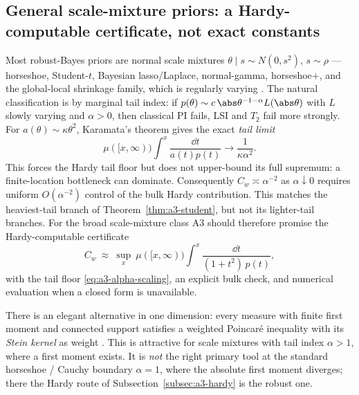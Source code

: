 \documentclass[../../main.tex]{subfiles}
\begin{document}
\subsection{General scale-mixture priors: a Hardy-computable certificate, not exact constants}
\label{subsec:a3-scalemix}

Most robust-Bayes priors are normal scale mixtures $\theta\mid s\sim N(0,s^2)$, $s\sim\rho$ ---
horseshoe, Student-$t$, Bayesian lasso/Laplace, normal-gamma, horseshoe$+$, and the global-local
shrinkage family, which is regularly varying \cite{BhadraDattaPolsonWillard2016}. The natural
classification is by marginal tail index: if $p(\theta)\sim c\,\abs\theta^{-1-\alpha}L(\abs\theta)$
with $L$ slowly varying and $\alpha>0$, then classical PI fails, LSI and $T_2$ fail more strongly.
For $a(\theta)\sim\kappa\theta^2$, Karamata's theorem gives the exact \emph{tail limit}
\begin{equation}\label{eq:a3-alpha-scaling}
  \mu([x,\infty))\int^x\frac{\dd t}{a(t)p(t)}\longrightarrow
  \frac{1}{\kappa\alpha^2}.
\end{equation}
This forces the Hardy tail floor but does not upper-bound its full supremum: a finite-location
bottleneck can dominate. Consequently $C_w\asymp\alpha^{-2}$ as $\alpha\downarrow0$ requires
uniform $O(\alpha^{-2})$ control of the bulk Hardy contribution. This matches the heaviest-tail
branch of Theorem~\ref{thm:a3-student}, but not its lighter-tail branches. For the broad
scale-mixture class A3 should therefore promise the
Hardy-computable certificate
\begin{equation}\label{eq:a3-certificate}
  C_w\ \approx\ \sup_x\ \mu([x,\infty))\int^x\frac{\dd t}{(1+t^2)\,p(t)},
\end{equation}
with the tail floor \eqref{eq:a3-alpha-scaling}, an explicit bulk check, and numerical evaluation
when a closed form is unavailable.

\begin{remark}
\label{rem:a3-stein}
There is an elegant alternative in one dimension: every measure with finite first moment and
connected support satisfies a weighted Poincar\'e inequality with its \emph{Stein kernel} as
weight \cite{Saumard2019SteinKernel}. This is attractive for scale mixtures with tail index
$\alpha>1$, where a first moment exists. It is \emph{not} the right primary tool at the standard
horseshoe / Cauchy boundary $\alpha=1$, where the absolute first moment diverges; there the Hardy
route of Subsection~\ref{subsec:a3-hardy} is the robust one.
\end{remark}
\end{document}
